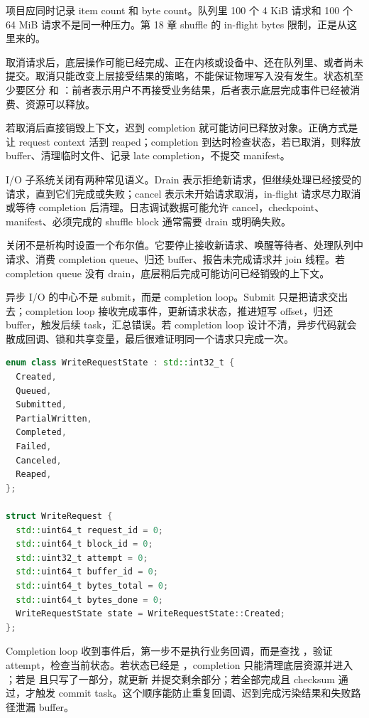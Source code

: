 项目应同时记录 item count 和 byte count。队列里 100 个 4 KiB 请求和 100 个 64 MiB 请求不是同一种压力。第 18 章 shuffle 的 in-flight bytes 限制，正是从这里来的。

取消请求后，底层操作可能已经完成、正在内核或设备中、还在队列里、或者尚未提交。取消只能改变上层接受结果的策略，不能保证物理写入没有发生。状态机至少要区分  和 ：前者表示用户不再接受业务结果，后者表示底层完成事件已经被消费、资源可以释放。

若取消后直接销毁上下文，迟到 completion 就可能访问已释放对象。正确方式是让 request context 活到 reaped；completion 到达时检查状态，若已取消，则释放 buffer、清理临时文件、记录 late completion，不提交 manifest。

I/O 子系统关闭有两种常见语义。Drain 表示拒绝新请求，但继续处理已经接受的请求，直到它们完成或失败；cancel 表示未开始请求取消，in-flight 请求尽力取消或等待 completion 后清理。日志调试数据可能允许 cancel，checkpoint、manifest、必须完成的 shuffle block 通常需要 drain 或明确失败。

关闭不是析构时设置一个布尔值。它要停止接收新请求、唤醒等待者、处理队列中请求、消费 completion queue、归还 buffer、报告未完成请求并 join 线程。若 completion queue 没有 drain，底层稍后完成可能访问已经销毁的上下文。

异步 I/O 的中心不是 submit，而是 completion loop。Submit 只是把请求交出去；completion loop 接收完成事件，更新请求状态，推进短写 offset，归还 buffer，触发后续 task，汇总错误。若 completion loop 设计不清，异步代码就会散成回调、锁和共享变量，最后很难证明同一个请求只完成一次。

\begin{lstlisting}[language=C++,caption={WriteRequest 的示例状态}]
enum class WriteRequestState : std::int32_t {
  Created,
  Queued,
  Submitted,
  PartialWritten,
  Completed,
  Failed,
  Canceled,
  Reaped,
};

struct WriteRequest {
  std::uint64_t request_id = 0;
  std::uint64_t block_id = 0;
  std::uint32_t attempt = 0;
  std::uint64_t buffer_id = 0;
  std::uint64_t bytes_total = 0;
  std::uint64_t bytes_done = 0;
  WriteRequestState state = WriteRequestState::Created;
};
\end{lstlisting}

Completion loop 收到事件后，第一步不是执行业务回调，而是查找 ，验证 attempt，检查当前状态。若状态已经是 ，completion 只能清理底层资源并进入 ；若是  且只写了一部分，就更新  并提交剩余部分；若全部完成且 checksum 通过，才触发 commit task。这个顺序能防止重复回调、迟到完成污染结果和失败路径泄漏 buffer。

